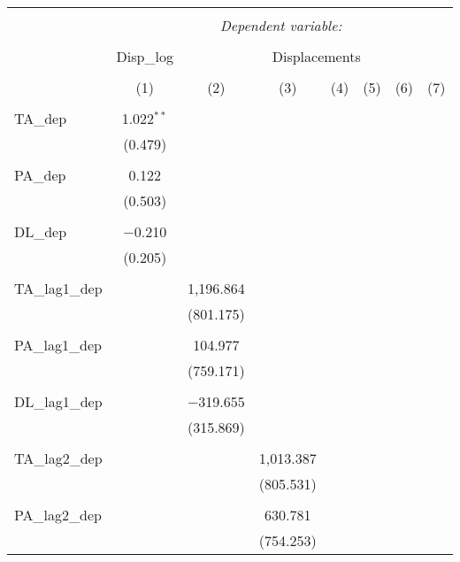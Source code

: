 
\begin{table}[!htbp] \centering 
  \caption{} 
  \label{} 
\begin{tabular}{@{\extracolsep{5pt}}lccccccc} 
\\[-1.8ex]\hline 
\hline \\[-1.8ex] 
 & \multicolumn{7}{c}{\textit{Dependent variable:}} \\ 
\cline{2-8} 
\\[-1.8ex] & Disp\_log & \multicolumn{6}{c}{Displacements} \\ 
\\[-1.8ex] & (1) & (2) & (3) & (4) & (5) & (6) & (7)\\ 
\hline \\[-1.8ex] 
 TA\_dep & 1.022$^{**}$ &  &  &  &  &  &  \\ 
  & (0.479) &  &  &  &  &  &  \\ 
  & & & & & & & \\ 
 PA\_dep & 0.122 &  &  &  &  &  &  \\ 
  & (0.503) &  &  &  &  &  &  \\ 
  & & & & & & & \\ 
 DL\_dep & $-$0.210 &  &  &  &  &  &  \\ 
  & (0.205) &  &  &  &  &  &  \\ 
  & & & & & & & \\ 
 TA\_lag1\_dep &  & 1,196.864 &  &  &  &  &  \\ 
  &  & (801.175) &  &  &  &  &  \\ 
  & & & & & & & \\ 
 PA\_lag1\_dep &  & 104.977 &  &  &  &  &  \\ 
  &  & (759.171) &  &  &  &  &  \\ 
  & & & & & & & \\ 
 DL\_lag1\_dep &  & $-$319.655 &  &  &  &  &  \\ 
  &  & (315.869) &  &  &  &  &  \\ 
  & & & & & & & \\ 
 TA\_lag2\_dep &  &  & 1,013.387 &  &  &  &  \\ 
  &  &  & (805.531) &  &  &  &  \\ 
  & & & & & & & \\ 
 PA\_lag2\_dep &  &  & 630.781 &  &  &  &  \\ 
  &  &  & (754.253) &  &  &  &  \\ 

\end{tabular}
\end{table}
